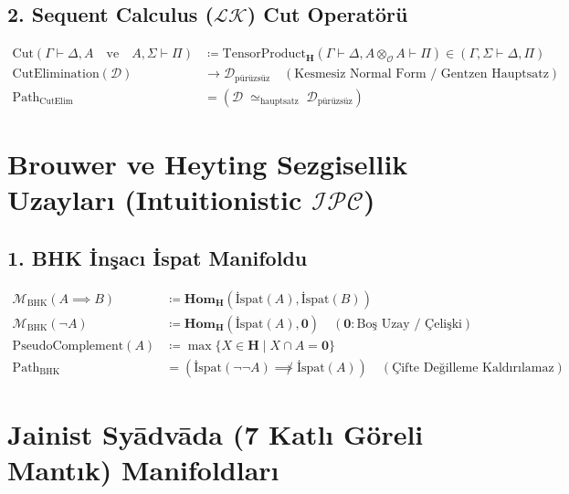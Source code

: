 \documentclass[11pt, a4paper]{article}
\begin{document}
\subsection{2. Sequent Calculus ($\mathcal{L}\mathcal{K}$) Cut Operatörü}
\begin{align}
\text{Cut}(\Gamma \vdash \Delta, A \quad \text{ve} \quad A, \Sigma \vdash \Pi) &\coloneqq \text{TensorProduct}_{\mathbf{H}}(\Gamma \vdash \Delta, A \otimes_{\mathcal{O}} A \vdash \Pi) \in (\Gamma, \Sigma \vdash \Delta, \Pi) \\
\text{CutElimination}(\mathcal{D}) &\longrightarrow \mathcal{D}_{\text{pürüzsüz}} \quad (\text{Kesmesiz Normal Form / Gentzen Hauptsatz}) \\
\text{Path}_{\text{CutElim}} &= (\mathcal{D} \;\simeq_{\text{hauptsatz}}\; \mathcal{D}_{\text{pürüzsüz}})
\end{align}

\section{Brouwer ve Heyting Sezgisellik Uzayları (Intuitionistic $\mathcal{I}\mathcal{P}\mathcal{C}$)}

\subsection{1. BHK İnşacı İspat Manifoldu}
\begin{align}
\mathcal{M}_{\text{BHK}}(A \implies B) &\coloneqq \mathbf{Hom}_{\mathbf{H}}(\text{İspat}(A), \text{İspat}(B)) \\
\mathcal{M}_{\text{BHK}}(\neg A) &\coloneqq \mathbf{Hom}_{\mathbf{H}}(\text{İspat}(A), \mathbf{0}) \quad (\mathbf{0}: \text{Boş Uzay / Çelişki}) \\
\text{PseudoComplement}(A) &\coloneqq \max \{ X \in \mathbf{H} \mid X \cap A = \mathbf{0} \} \\
\text{Path}_{\text{BHK}} &= (\text{İspat}(\neg\neg A) \not\implies \text{İspat}(A)) \quad (\text{Çifte Değilleme Kaldırılamaz})
\end{align}

\section{Jainist Syādvāda (7 Katlı Göreli Mantık) Manifoldları}
\end{document}
